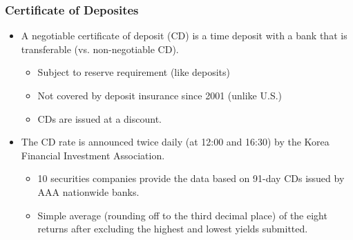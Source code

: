\documentclass[10pt]{beamer}
\begin{document}
	
	
	
	\begin{frame}
		\frametitle{Certificate of Deposites}
		
		\begin{itemize}  \vspace{5pt} \itemsep10pt
			\item A negotiable certificate of deposit (CD) is a time deposit with a bank that is transferable (vs. non-negotiable CD). 
			\begin{itemize}  \vspace{5pt} \itemsep10pt
				\item Subject to reserve requirement (like deposits)
				\item Not covered by deposit insurance since 2001 (unlike U.S.)
				\item CDs are issued at a discount.
			\end{itemize}		
			
			\item The CD rate is announced twice daily (at 12:00
			and 16:30) by the Korea Financial Investment Association.
			\begin{itemize}  \vspace{5pt} \itemsep10pt
				\item 10 securities companies provide the data based on 91-day CDs issued by AAA nationwide banks.
				\item Simple average (rounding off to the third decimal place) of the eight returns after excluding the highest and lowest yields submitted.
			\end{itemize} 	
		\end{itemize}		
		
	\end{frame}
	
	
	
\end{document}
